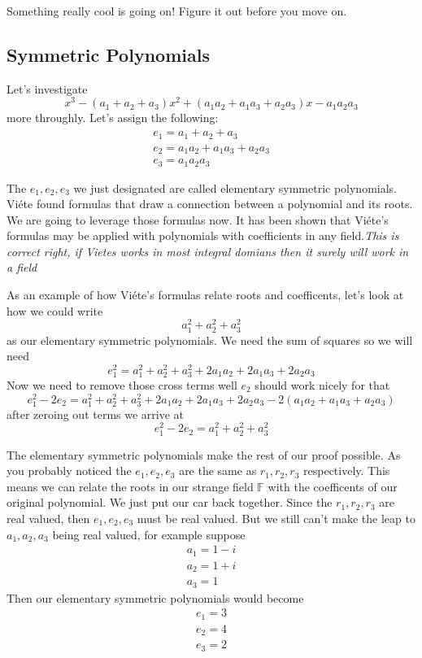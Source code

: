 \documentclass[12pt]{article}
\begin{document}
Something really cool is going on!  Figure it out before you move on.

\subsection*{Symmetric Polynomials}
Let's investigate $$x^3 -(a_1+a_2+a_3)x^2+(a_1a_2 +a_1a_3 +a_2a_3)x -a_1a_2a_3$$ more throughly.  Let's assign the following:
\begin{align*}
e_1 = a_1 + a_2 +a_3 \\
e_2 = a_1a_2 +a_1a_3 +a_2a_3 \\
e_3 = a_1a_2a_3
\end{align*}

The $e_1, e_2, e_3$ we just designated are called elementary symmetric polynomials.  Vi\'ete found formulas that draw a connection between a polynomial and its roots.  We are going to leverage those formulas now.  It has been shown that Vi\'ete's formulas may be applied with polynomials with coefficients in any field.\emph{This is correct right, if Vietes works in most integral domians then it surely will work in a field}


As an example of how Vi\'ete's formulas relate roots and coefficents, let's look at how we could write
$$ a_1^2 + a_2^2 + a_3^2$$
as our elementary symmetric polynomials.  We need the sum of squares so we will need $$e_1^2 = a_1^2 + a_2^2 + a_3^2 + 2a_1a_2 + 2a_1a_3 + 2a_2a_3$$
Now we need to remove those cross terms well $e_2$ should work nicely for that
$$e_1^2 - 2e_2 = a_1^2 + a_2^2 + a_3^2 + 2a_1a_2 + 2a_1a_3 + 2a_2a_3 - 2(a_1a_2 +a_1a_3 +a_2a_3)$$
after zeroing out terms we arrive at
$$e_1^2 - 2e_2 = a_1^2 + a_2^2 + a_3^2$$


The elementary symmetric polynomials make the rest of our proof possible.  As you probably noticed the $e_1, e_2, e_3$ are the same as $r_1, r_2, r_3$ respectively.  This means we can relate the roots in our strange field $\mathbb{F}$ with the coefficents of our original polynomial.  We just put our car back together.  Since the $r_1, r_2, r_3$ are real valued, then $e_1, e_2, e_3$ must be real valued.  But we still can't make the leap to $a_1, a_2, a_3$ being real valued, for example suppose 
\begin{align*}
a_1 = 1-i \\
a_2 = 1+i \\
a_3 = 1
\end{align*}
Then our elementary symmetric polynomials would become
\begin{align*}
e_1 = 3 \\
e_2 = 4 \\
e_3 = 2
\end{align*}
\end{document}
